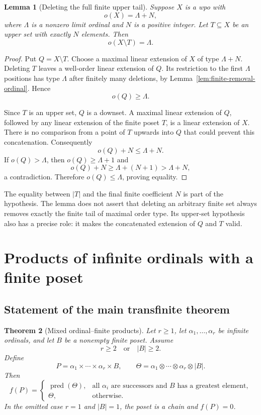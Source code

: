 \documentclass[11pt,letterpaper]{article}
\newtheorem{theorem}{Theorem}[section]
\newtheorem{lemma}[theorem]{Lemma}
\theoremstyle{definition}
\theoremstyle{remark}
\newcommand{\pred}{\operatorname{pred}}
\begin{document}
\begin{lemma}[Deleting the full finite upper tail]\label{lem:upper-tail}
Suppose $X$ is a wpo with
\[
 o(X)=\Lambda+N,
\]
where $\Lambda$ is a nonzero limit ordinal and $N$ is a positive integer.
Let $T\subseteq X$ be an upper set with exactly $N$ elements. Then
\begin{equation}\label{eq:core-mot}
 o(X\setminus T)=\Lambda.
\end{equation}
\end{lemma}
\begin{proof}
Put $Q=X\setminus T$. Choose a maximal linear extension of $X$ of type
$\Lambda+N$. Deleting $T$ leaves a well-order linear extension of $Q$.
Its restriction to the first $\Lambda$ positions has type $\Lambda$ after
finitely many deletions, by Lemma~\ref{lem:finite-removal-ordinal}. Hence
\[
 o(Q)\ge\Lambda.
\]

Since $T$ is an upper set, $Q$ is a downset. A maximal linear extension of
$Q$, followed by any linear extension of the finite poset $T$, is a linear
extension of $X$. There is no comparison from a point of $T$ upwards into
$Q$ that could prevent this concatenation. Consequently
\[
 o(Q)+N\le\Lambda+N.
\]
If $o(Q)>\Lambda$, then $o(Q)\ge\Lambda+1$ and
\[
 o(Q)+N\ge\Lambda+(N+1)>\Lambda+N,
\]
a contradiction. Therefore $o(Q)\le\Lambda$, proving equality.
\end{proof}

The equality between $|T|$ and the final finite coefficient $N$ is part of
the hypothesis. The lemma does not assert that deleting an arbitrary
finite set always removes exactly the finite tail of maximal order type.
Its upper-set hypothesis also has a precise role: it makes the
concatenated extension of $Q$ and $T$ valid.

\section{Products of infinite ordinals with a finite poset}\label{sec:mixed}

\subsection{Statement of the main transfinite theorem}

\begin{theorem}[Mixed ordinal--finite products]\label{thm:mixed}
Let $r\ge1$, let $\alpha_1,\ldots,\alpha_r$ be infinite ordinals, and let
$B$ be a nonempty finite poset. Assume
\[
 r\ge2\quad\text{or}\quad |B|\ge2.
\]
Define
\[
 P=\alpha_1\times\cdots\times\alpha_r\times B,
 \qquad
 \Theta=\alpha_1\otimes\cdots\otimes\alpha_r\otimes |B|.
\]
Then
\begin{equation}\label{eq:mixed}
 \boxed{
 f(P)=
 \begin{cases}
  \pred(\Theta),&\text{all $\alpha_i$ are successors and $B$ has a greatest element},\\[2pt]
  \Theta,&\text{otherwise}.
 \end{cases}}
\end{equation}
In the omitted case $r=1$ and $|B|=1$, the poset is a chain and $f(P)=0$.
\end{theorem}
\end{document}
